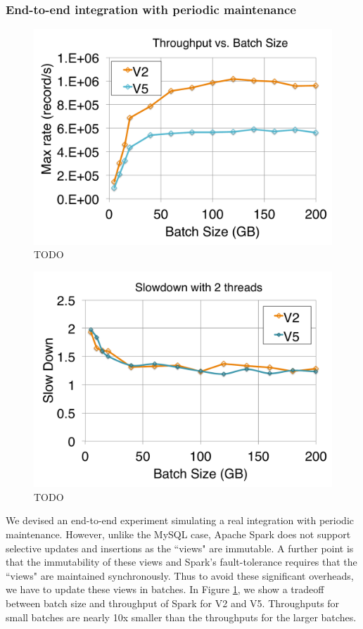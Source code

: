 \subsubsection{End-to-end integration with periodic maintenance}
\begin{figure}[t]
\centering
 \includegraphics[scale=0.14]{exp/con_3.pdf}
 \caption{TODO \label{conv-2}}
\end{figure}

\begin{figure}[t]
\centering
 \includegraphics[scale=0.14]{exp/con_4.pdf}
 \caption{TODO \label{conv-3}}
\end{figure}

We devised an end-to-end experiment simulating a real integration with periodic maintenance.
However, unlike the MySQL case, Apache Spark does not support selective updates and insertions as the ``views" are immutable.
A further point is that the immutability of these views and Spark's fault-tolerance requires that the ``views" are maintained synchronously.
Thus to avoid these significant overheads, we have to update these views in batches.
In Figure \ref{conv-2}, we show a tradeoff between batch size and throughput of Spark for V2 and V5.
Throughputs for small batches are nearly 10x smaller than the throughputs for the larger batches.

